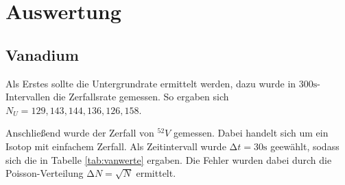 \section{Auswertung}
\label{sec:Auswertung}

\subsection{Vanadium}
Als Erstes sollte die Untergrundrate ermittelt werden, dazu wurde in 
$300 \si{\s}$-Intervallen die Zerfallsrate gemessen. So ergaben sich
$N_U = {129, 143, 144, 136, 126, 158}$.

Anschließend wurde der Zerfall von $^{52}V$ gemessen. Dabei handelt sich um 
ein Isotop mit einfachem Zerfall. Als Zeitintervall wurde $\increment t = 30 \si{\s}$
geewählt, sodass sich die in Tabelle \ref{tab:vanwerte} ergaben. Die Fehler wurden dabei 
durch die Poisson-Verteilung $\increment N = \sqrt{N}$ ermittelt.

